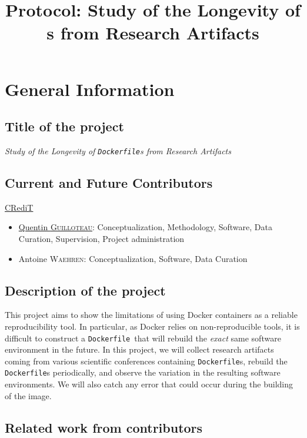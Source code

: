 \documentclass{article}
\title{Protocol: Study of the Longevity of \dfile s from Research Artifacts}
\newcommand{\dfile}{\texttt{Dockerfile}}
\begin{document}
\maketitle

\section{General Information}

\subsection{Title of the project}

\emph{Study of the Longevity of \dfile s from Research Artifacts}

\subsection{Current and Future Contributors}

\href{https://www.elsevier.com/researcher/author/policies-and-guidelines/credit-author-statement}{CRediT}

\begin{itemize}
  \item \href{https://orcid.org/0009-0003-7645-5044}{Quentin \textsc{Guilloteau}}: Conceptualization, Methodology, Software, Data Curation, Supervision, Project administration
  \item Antoine \textsc{Waehren}: Conceptualization, Software, Data Curation
\end{itemize}


\subsection{Description of the project}

This project aims to show the limitations of using Docker containers as a reliable reproducibility tool.
In particular, as Docker relies on non-reproducible tools, it is difficult to construct a \dfile\ that will rebuild the \emph{exact} same software environment in the future.
In this project, we will collect research artifacts coming from various scientific conferences containing \dfile s, rebuild the \dfile s periodically, and observe the variation in the resulting software environments.
We will also catch any error that could occur during the building of the image.

\subsection{Related work from contributors}
\end{document}
